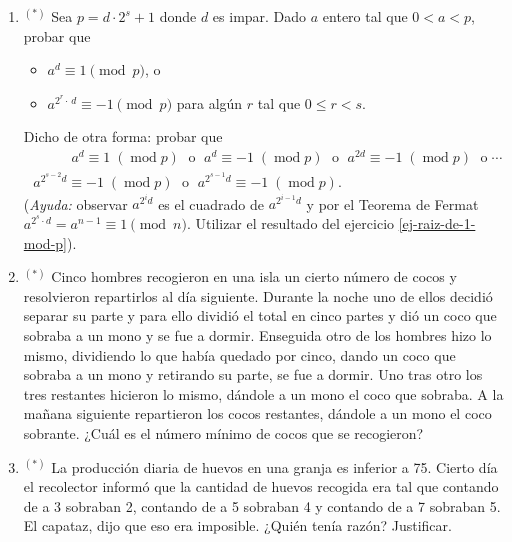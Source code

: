 \documentclass[a4paper,12pt,twoside,spanish,reqno]{amsbook}
\numberwithin{equation}{section}
\begin{document}
\begin{enumerate}[resume]
\item${}^{(*)}$ Sea  $p = d \cdot 2^s + 1$ donde $d$ es impar. Dado $a$ entero tal que $0 < a <p$, probar que 
    \begin{itemize}
        \item $a^{d} \equiv 1 \pmod{p}$, o
        \item $a^{2^r\cdot\, d} \equiv -1 \pmod{p}$  para algún $r$ tal que $0 \le r < s$.
    \end{itemize} 
    Dicho de otra forma: probar que
    \begin{multline*}
        \qquad\quad a^{d} \equiv 1 \;(\operatorname{mod} p) \;\text{ o }\; a^{d} \equiv -1 \;(\operatorname{mod} p) \;\text{ o }\;a^{2d} \equiv -1 \;(\operatorname{mod} p) \;\text{ o} \; \cdots\\ \; a^{2^{s-2}d} \equiv -1 \;(\operatorname{mod} p)\; \text{ o }\; a^{2^{s-1}d} \equiv -1 \;(\operatorname{mod} p).
    \end{multline*}
    (\textit{Ayuda:} observar $a^{2^{i}d}$ es el cuadrado de $a^{2^{i-1}d}$ y por el Teorema de Fermat $a^{2^s \cdot d} = a^{n-1} \equiv 1 \pmod{n}$. Utilizar el resultado del ejercicio \ref{ej-raiz-de-1-mod-p}).


\item${}^{(*)}$ Cinco hombres recogieron en una isla un cierto número de cocos y resolvieron repartirlos al día siguiente. Durante la noche uno de ellos decidió separar su parte y para ello dividió el total en cinco partes y dió un coco que sobraba a un mono y se fue a dormir. Enseguida otro de los hombres hizo lo mismo, dividiendo lo que había quedado por cinco, dando un coco que sobraba a un mono y retirando su parte, se fue a dormir. Uno tras otro los tres restantes hicieron lo mismo, dándole a un mono el coco que sobraba. A la ma\~nana siguiente repartieron los cocos restantes, dándole a un mono el coco sobrante. ¿Cuál es el número mínimo de cocos que se recogieron?


\item${}^{(*)}$ La producción diaria de huevos en una granja es inferior a 75. Cierto día el recolector informó que la cantidad de huevos recogida era tal que contando de a 3 sobraban 2, contando de a 5 sobraban 4 y contando de a 7 sobraban 5. El capataz, dijo que eso era imposible. ¿Quién tenía razón? Justificar.

%
\end{enumerate}
\end{document}
